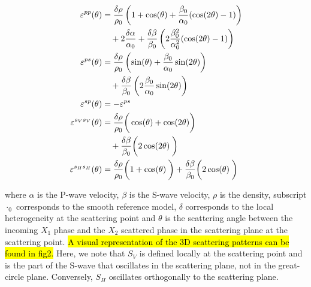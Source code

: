 \documentclass[10pt,a4paper]{article}
\begin{document}
\begin{align}
  \varepsilon^{pp} (\theta) &= \dfrac{\delta \rho}{\rho_0} 
                               \left( 1 + \cos(\theta) + \dfrac{\beta_0}{\alpha_0} (\cos(2\theta)-1) \right) \notag
                   \\ & \quad + 2 \dfrac{\delta \alpha}{\alpha_0} 
                               + \dfrac{\delta \beta}{\beta_0} \left( 2 \dfrac{\beta_0^2}{\alpha_0^2} (\cos(2\theta)-1) \right)
\\
  \varepsilon^{ps} (\theta) &= \dfrac{\delta \rho}{\rho_0} 
                               \left( \sin(\theta) + \dfrac{\beta_0}{\alpha_0} \sin(2\theta) \right) \notag
                   \\ & \quad + \dfrac{\delta \beta}{\beta_0} \left( 2 \dfrac{\beta_0}{\alpha_0} \sin(2\theta) \right)
\\
  \varepsilon^{sp} (\theta) &= - \varepsilon^{ps}
\\
  \varepsilon^{s_Vs_V} (\theta) &= \dfrac{\delta \rho}{\rho_0} 
                                   \bigg( \cos(\theta) + \cos(2\theta) \bigg) \notag
                       \\ & \quad + \dfrac{\delta \beta}{\beta_0} \bigg( 2 \cos(2\theta) \dfrac{}{} \bigg) 
\\
  \varepsilon^{s_Hs_H} (\theta) &= \dfrac{\delta \rho}{\rho_0} 
                                   \bigg( 1 + \cos(\theta) \dfrac{}{} \bigg)
                                   + \dfrac{\delta \beta}{\beta_0} \bigg( 2 \cos(\theta) \dfrac{}{} \bigg)
\end{align}
\vspace{1mm}

\noindent where $\alpha$ is the P-wave velocity, 
$\beta$ is the S-wave velocity, 
$\rho$ is the density, 
subscript $\cdot_0$ corresponds to the smooth reference model, 
$\delta$ corresponds to the local heterogeneity at the scattering point and 
$\theta$ is the scattering angle between the incoming $X_1$ phase and the $X_2$ scattered phase in the scattering plane at the scattering point.
\hl{A visual representation of the 3D scattering patterns can be found in fig2.}
Here, we note that $S_V$ is defined locally at the scattering point and is the part of the S-wave that oscillates in the scattering plane, not in the great-circle plane.
Conversely, $S_H$ oscillates orthogonally to the scattering plane.
\end{document}
